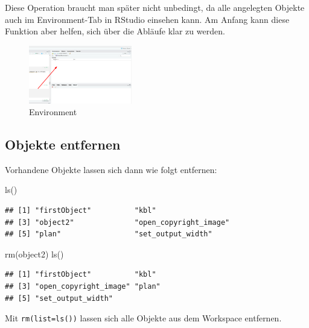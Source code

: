 \documentclass[
]{book}
\newenvironment{Shaded}{\begin{snugshade}}{\end{snugshade}}
\newcommand{\FunctionTok}[1]{\textcolor[rgb]{0.00,0.00,0.00}{#1}}
\newcommand{\NormalTok}[1]{#1}
\begin{document}
Diese Operation braucht man später nicht unbedingt, da alle angelegten Objekte auch im Environment-Tab in RStudio einsehen kann. Am Anfang kann diese Funktion aber helfen, sich über die Abläufe klar zu werden.

\begin{figure}
\centering
\includegraphics[width=0.4\textwidth,height=\textheight]{imgs/environment.png}
\caption{Environment}
\end{figure}

\hypertarget{objekte-entfernen}{%
\subsection*{Objekte entfernen}\label{objekte-entfernen}}

Vorhandene Objekte lassen sich dann wie folgt entfernen:

\begin{Shaded}
\begin{Highlighting}[]
\FunctionTok{ls}\NormalTok{()}
\end{Highlighting}
\end{Shaded}

\begin{verbatim}
## [1] "firstObject"          "kbl"                 
## [3] "object2"              "open_copyright_image"
## [5] "plan"                 "set_output_width"
\end{verbatim}

\begin{Shaded}
\begin{Highlighting}[]
\FunctionTok{rm}\NormalTok{(object2)}
\FunctionTok{ls}\NormalTok{()}
\end{Highlighting}
\end{Shaded}

\begin{verbatim}
## [1] "firstObject"          "kbl"                 
## [3] "open_copyright_image" "plan"                
## [5] "set_output_width"
\end{verbatim}

Mit \texttt{rm(list=ls())} lassen sich alle Objekte aus dem Workspace entfernen.
\end{document}
